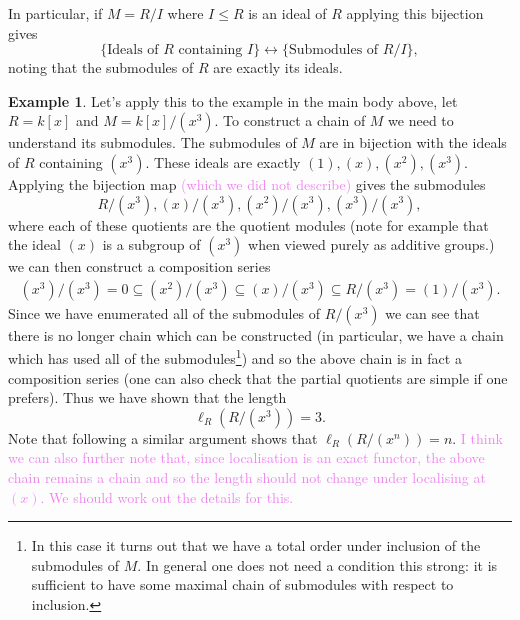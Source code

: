 \documentclass{article}
\theoremstyle{definition}
\newtheorem{example}[theorem]{Example}
\theoremstyle{remark}
\newcommand{\wg}[1]{\textcolor{violet}{#1}}
\begin{document}
In particular, if $M = R/I$ where $I \leq R$ is an ideal of $R$ applying this
bijection gives
\[
    \{\text{Ideals of $R$ containing $I$}\} \leftrightarrow
    \{\text{Submodules of $R/I$}\},
\]
noting that the submodules of $R$ are exactly its ideals.

\begin{example}
Let's apply this to the example in the main body above, let $R = k[x]$ and $M =
k[x]/(x^3)$. To construct a chain of $M$ we need to understand its submodules.
The submodules of $M$ are in bijection with the ideals of $R$ containing
$(x^3)$. These ideals are exactly $(1), (x), (x^2), (x^3)$. Applying the
bijection map \wg{(which we did not describe)} gives the submodules
\[
    R/(x^3),(x)/(x^3), (x^2)/(x^3), (x^3)/(x^3),
\]
where each of these quotients are the quotient modules 
(note for example that the ideal $(x)$ is a subgroup of $(x^3)$ when viewed
purely as additive groups.)
we can then construct a composition series
\begin{align*}
    (x^3)/(x^3) = 0 \subseteq (x^2)/(x^3) \subseteq (x)/(x^3) \subseteq R/(x^3) = (1)/(x^3).
\end{align*}
Since we have enumerated all of the submodules of $R/(x^3)$ we can see that
there is no longer chain which can be constructed (in particular, we have a
chain which has used all of the submodules\footnote{
In this case it turns out that we have a total order under inclusion of the
submodules of $M$. In general one does not need a condition this strong: it is
sufficient to have some maximal chain of submodules with respect to inclusion.
}) 
and so the above chain is in fact a
composition series (one can also check that the partial quotients are simple if
one prefers). Thus we have shown that the length 
\[
    \ell_{R}(R/(x^3)) = 3.
\]
Note that following a similar argument shows that $\ell_{R}(R/(x^n)) = n$. 
\wg{I think we can also further note that, since localisation is an exact
functor, the above chain remains a chain and so the length should not change 
under localising at $(x)$. We should work out the details for this.}
\end{example}
\end{document}
